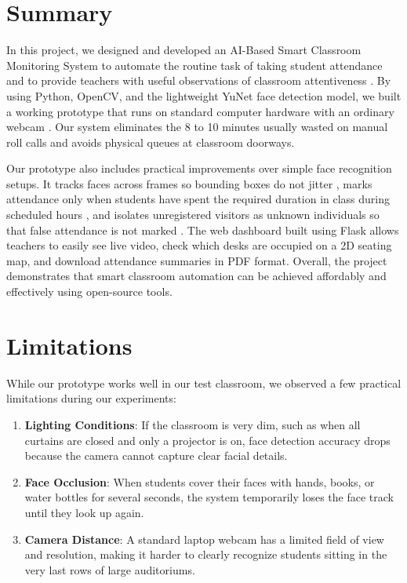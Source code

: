 \documentclass[10pt]{report}
\begin{document}
\section{Summary}
\hspace{0.5cm}In this project, we designed and developed an AI-Based Smart Classroom Monitoring System to automate the routine task of taking student attendance and to provide teachers with useful observations of classroom attentiveness \cite{ghodekar2023activeness}. By using Python, OpenCV, and the lightweight YuNet face detection model, we built a working prototype that runs on standard computer hardware with an ordinary webcam \cite{zhang2023realtime}. Our system eliminates the 8 to 10 minutes usually wasted on manual roll calls and avoids physical queues at classroom doorways.

\hspace{0.5cm}Our prototype also includes practical improvements over simple face recognition setups. It tracks faces across frames so bounding boxes do not jitter \cite{zhu2023tracking}, marks attendance only when students have spent the required duration in class during scheduled hours \cite{rajesh2023smart}, and isolates unregistered visitors as unknown individuals so that false attendance is not marked \cite{george2024edgeface}. The web dashboard built using Flask allows teachers to easily see live video, check which desks are occupied on a 2D seating map, and download attendance summaries in PDF format. Overall, the project demonstrates that smart classroom automation can be achieved affordably and effectively using open-source tools.

\section{Limitations}
\hspace{0.5cm}While our prototype works well in our test classroom, we observed a few practical limitations during our experiments:
\begin{enumerate}
    \item \textbf{Lighting Conditions}: If the classroom is very dim, such as when all curtains are closed and only a projector is on, face detection accuracy drops because the camera cannot capture clear facial details.
    \item \textbf{Face Occlusion}: When students cover their faces with hands, books, or water bottles for several seconds, the system temporarily loses the face track until they look up again.
    \item \textbf{Camera Distance}: A standard laptop webcam has a limited field of view and resolution, making it harder to clearly recognize students sitting in the very last rows of large auditoriums.
\end{enumerate}
\end{document}
